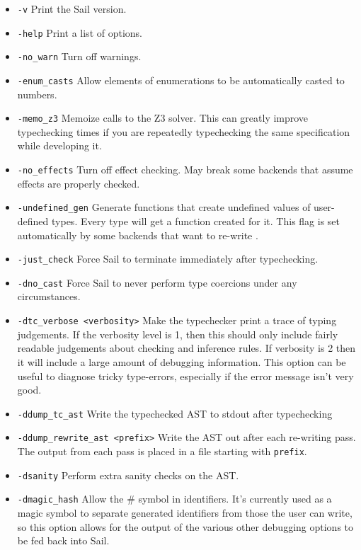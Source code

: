 \begin{itemize}
\item {\verb+-v+} Print the Sail version.

\item {\verb+-help+} Print a list of options.

\item {\verb+-no_warn+} Turn off warnings.

\item {\verb+-enum_casts+} Allow elements of enumerations to be
  automatically casted to numbers.

\item \verb+-memo_z3+ Memoize calls to the Z3 solver. This can greatly
  improve typechecking times if you are repeatedly typechecking the
  same specification while developing it.

\item \verb+-no_effects+ Turn off effect checking. May break some
  backends that assume effects are properly checked.

\item \verb+-undefined_gen+ Generate functions that create undefined
  values of user-defined types. Every type  will get a
   function created for it. This flag is set
  automatically by some backends that want to re-write .

\item \verb+-just_check+ Force Sail to terminate immediately after
  typechecking.

\item \verb+-dno_cast+ Force Sail to never perform type coercions
  under any circumstances.

\item \verb+-dtc_verbose <verbosity>+ Make the typechecker print a
  trace of typing judgements. If the verbosity level is 1, then this
  should only include fairly readable judgements about checking and
  inference rules. If verbosity is 2 then it will include a large
  amount of debugging information. This option can be useful to
  diagnose tricky type-errors, especially if the error message isn't
  very good.

\item \verb+-ddump_tc_ast+ Write the typechecked AST to stdout after
  typechecking

\item \verb+-ddump_rewrite_ast <prefix>+ Write the AST out after each
  re-writing pass. The output from each pass is placed in a file
  starting with \verb+prefix+.

\item \verb+-dsanity+ Perform extra sanity checks on the AST.

\item \verb+-dmagic_hash+ Allow the \# symbol in identifiers. It's
  currently used as a magic symbol to separate generated identifiers
  from those the user can write, so this option allows for the output
  of the various other debugging options to be fed back into Sail.
\end{itemize}
